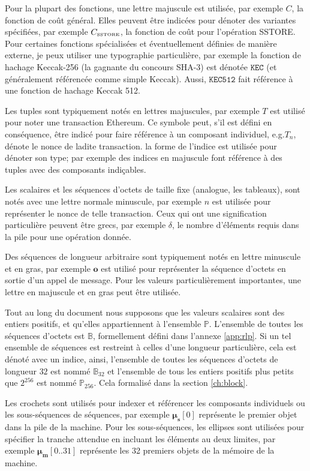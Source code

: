 \documentclass[9pt,oneside]{amsart}
\makeatletter
\newcommand*\eg{e.g.\@\xspace}
\makeatother
\begin{document}
\begin{multicols}{2}
Pour la plupart des fonctions, une lettre majuscule est utilisée, par exemple $C$, la fonction de coût général. Elles peuvent être indicées pour dénoter des variantes spécifiées, par exemple $C_\text{\tiny SSTORE}$,
la fonction de coût pour l'opération {\tiny SSTORE}. Pour certaines fonctions spécialisées et éventuellement définies de manière externe, je peux utiliser une typographie particulière, par exemple la fonction de hachage Keccak-256 (la gagnante du concours SHA-3) est dénotée $\texttt{KEC}$ (et généralement référencée comme simple Keccak). Aussi, $\texttt{KEC512}$ fait référence à une fonction de hachage Keccak 512.

Les tuples sont typiquement notés en lettres majuscules, par exemple $T$ est utilisé pour noter une transaction Ethereum. Ce symbole peut, s’il est défini en conséquence, être indicé pour faire référence à un composant individuel, \eg $T_n$, dénote le nonce de ladite transaction. la forme de l'indice est utilisée pour dénoter son type; par exemple des indices en majuscule font référence à des tuples avec des composants indiçables.

Les scalaires et les séquences d'octets de taille fixe (analogue, les tableaux), sont notés avec une lettre normale minuscule, par exemple $n$ est utilisée pour représenter le nonce de telle transaction. Ceux qui ont une signification particulière peuvent être grecs, par exemple $\delta$, le nombre d'éléments requis dans la pile pour une opération donnée.

Des séquences de longueur arbitraire sont typiquement notés en lettre minuscule et en gras, par exemple $\mathbf{o}$ est utilisé pour représenter la séquence d'octets en sortie d'un appel de message. Pour les valeurs particulièrement importantes, une lettre en majuscule et en gras peut être utilisée.

Tout au long du document nous supposons que les valeurs scalaires sont des entiers positifs, et qu'elles appartiennent à l'ensemble $\mathbb{P}$. L'ensemble de toutes les séquences d'octets est $\mathbb{B}$, formellement défini dans l'annexe \ref{app:rlp}. Si un tel ensemble de séquences est restreint à celles d'une longueur particulière, cela est dénoté avec un indice, ainsi, l'ensemble de toutes les séquences d'octets de longueur $32$  est nommé $\mathbb{B}_{32}$ et l'ensemble de tous les entiers positifs plus petits que $2^{256}$ est nommé $\mathbb{P}_{256}$. Cela formalisé dans la section \ref{ch:block}.

Les crochets sont utilisés pour indexer et référencer les composants individuels ou les sous-séquences de séquences, par exemple $\boldsymbol{\mu}_\mathbf{s}[0]$ représente le premier objet dans la pile de la machine. Pour les sous-séquences, les ellipses sont utilisées pour spécifier la tranche attendue en incluant les éléments au deux limites, par exemple $\boldsymbol{\mu}_\mathbf{m}[0..31]$ représente les 32 premiers objets de la mémoire de la machine.


\end{multicols}
\end{document}

